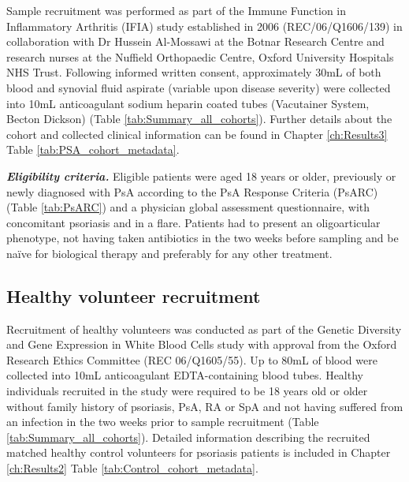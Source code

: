 Sample recruitment was performed as part of the Immune Function in Inflammatory Arthritis (IFIA) study established in 2006 (REC/06/Q1606/139) in collaboration with Dr Hussein Al-Mossawi at the Botnar Research Centre and research nurses at the Nuffield Orthopaedic Centre, Oxford University Hospitals NHS Trust. Following informed written consent, approximately 30mL of both blood and synovial fluid aspirate (variable upon disease severity) were collected into 10mL anticoagulant sodium heparin coated tubes (Vacutainer System, Becton Dickson) (Table \ref{tab:Summary_all_cohorts}). Further details about the cohort and collected clinical information can be found in Chapter \ref{ch:Results3} Table \ref{tab:PSA_cohort_metadata}.

\textbf{\textit{Eligibility criteria.}} Eligible patients were aged 18 years or older, previously or newly diagnosed with PsA according to the PsA Response Criteria (PsARC) (Table \ref{tab:PsARC}) and a physician global assessment questionnaire, with concomitant psoriasis and in a flare. Patients had to present an oligoarticular phenotype, not having taken antibiotics in the two weeks before sampling and be na\"{i}ve for biological therapy and preferably for any other treatment.    


\subsection{Healthy volunteer recruitment}
Recruitment of healthy volunteers was conducted as part of the Genetic Diversity and Gene Expression in White Blood Cells study with approval from the Oxford Research Ethics Committee (REC 06/Q1605/55). Up to 80mL of blood were collected into 10mL anticoagulant EDTA-containing blood tubes. Healthy individuals recruited in the study were required to be 18 years old or older without family history of psoriasis, PsA, RA or SpA and not having suffered from an infection in the two weeks prior to sample recruitment (Table \ref{tab:Summary_all_cohorts}). Detailed information describing the recruited matched healthy control volunteers for psoriasis patients is included in Chapter \ref{ch:Results2} Table \ref{tab:Control_cohort_metadata}.


